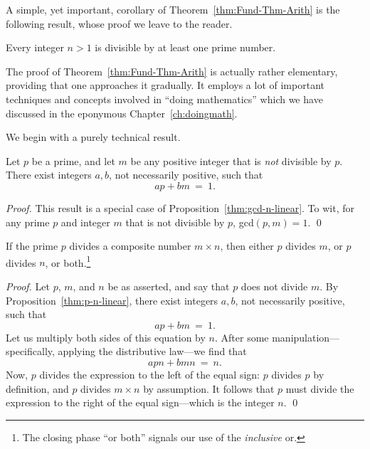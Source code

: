 A simple, yet important, corollary of Theorem~\ref{thm:Fund-Thm-Arith} is the following result, whose proof we leave to the reader.

\begin{prop}
\label{thm:prime-divisor}
Every integer $n>1$ is divisible by at least one prime number.
\end{prop}

\medskip

The proof of Theorem~\ref{thm:Fund-Thm-Arith} is actually rather elementary, providing that one approaches it gradually.  It employs a lot of important techniques and concepts involved in ``doing mathematics'' which we have discussed in the eponymous Chapter~\ref{ch:doingmath}.

\medskip

We begin with a purely technical result.

\begin{prop}
\label{thm:p-n-linear}
Let $p$ be a prime, and let $m$ be any positive integer that is {\em not} divisible by $p$.  There exist integers $a, b$, not necessarily positive, such that
\[ ap + bm \ = \ 1. \]
\end{prop}

\begin{proof}
This result is a special case of Proposition~\ref{thm:gcd-n-linear}.   To wit, for any prime $p$ and integer $m$ that is not divisible by $p$,  {\sc gcd}$(p, m) = 1$.  \qed
\end{proof}

\begin{prop}
\label{thm:p-divides-onefactor}
If the prime $p$ divides a composite number $m \times n$, then either $p$ divides $m$, or $p$ divides $n$, or both.\footnote{The closing phase ``or both'' signals our use of the {\em inclusive} or.}
\end{prop}

\begin{proof}
Let $p$, $m$, and $n$ be as asserted, and say that $p$ does not divide $m$.  By Proposition~\ref{thm:p-n-linear}, there exist integers $a, b$, not necessarily positive, such that
\[ ap + bm \ = \ 1. \]
Let us multiply both sides of this equation by $n$.  After some manipulation---specifically, applying the distributive law---we find that
\[ apn + bmn \ = \ n. \]
Now, $p$ divides the expression to the left of the equal sign: $p$ divides $p$ by definition, and $p$ divides $m \times n$ by assumption.  It follows that $p$ must divide the expression to the right of the equal sign---which is the integer $n$.  \qed
\end{proof}

